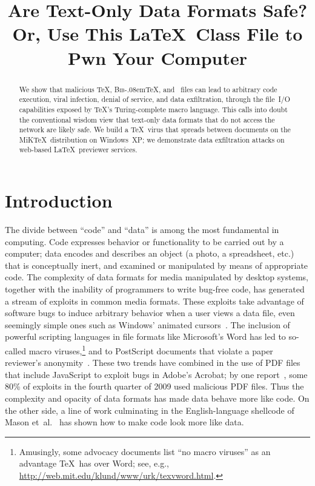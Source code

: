 \documentclass[nofontenc,pagenumbers,letterpaper,tight,twocolumn]{usenix09}
\title{Are Text-Only Data Formats Safe?\\
  Or, Use This \LaTeX\ Class File to Pwn Your Computer}
\newcommand*\BibTeX{\textsc{Bib}\kern-.08em\TeX}
\begin{document}
\maketitle
{}
{}
\begin{abstract}
  We show that malicious \TeX, \BibTeX, and \MP\ files can lead to
  arbitrary code execution, viral infection, denial of service, and
  data exfiltration, through the file~I/O capabilities exposed by
  \TeX's Turing-complete macro language.  This calls into doubt the
  conventional wisdom view that text-only data formats that do not
  access the network are likely safe.  We build a \TeX\ virus that
  spreads between documents on the MiK\TeX\ distribution on
  Windows~XP; we demonstrate data exfiltration attacks on
  web-based \LaTeX\ previewer services.
\end{abstract}

\section{Introduction}

The divide between ``code'' and ``data'' is among the most fundamental
in computing.  Code expresses behavior or functionality to be carried
out by a computer; data encodes and describes an object (a photo, a
spreadsheet, etc.\@) that is conceptually inert, and examined or
manipulated by means of appropriate code.
%
The complexity of data formats for media manipulated by desktop
systems, together with the inability of programmers to write
bug-free code, has generated a stream of exploits in common media
formats.  These exploits take advantage of software bugs to induce
arbitrary behavior when a user views a data file, even seemingly
simple ones such as Windows' animated cursors~\cite{gdi-vuln}.
%
The inclusion of powerful scripting languages in file formats like
Microsoft's Word has led to so-called macro
viruses,\footnote{Amusingly, some advocacy documents list ``no macro
  viruses'' as an advantage \TeX\ has over Word; see, e.g.,
  \url{http://web.mit.edu/klund/www/urk/texvword.html}.} and to
PostScript documents that violate a paper reviewer's
anonymity~\cite{infoflow}.
%
These two trends have combined in the use of PDF files that include
JavaScript to exploit bugs in Adobe's Acrobat; by one
report~\cite{agtr09}, some 80\% of exploits in the fourth quarter of
2009 used malicious PDF files.  Thus the complexity and opacity of
data formats has made data behave more like code.  On the other side,
a line of work culminating in the English-language shellcode of Mason
et~al.~\cite{mason-et-al:english-shellcode:ccs09} has shown how to
make code look more like data.
\end{document}
